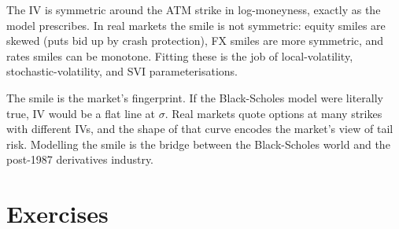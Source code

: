 The IV is symmetric around the ATM strike in log-moneyness, exactly as
the model prescribes. In real markets the smile is not symmetric: equity
smiles are skewed (puts bid up by crash protection), FX smiles are more
symmetric, and rates smiles can be monotone. Fitting these is the job of
local-volatility, stochastic-volatility, and SVI parameterisations.

\begin{keyinsight}
The smile is the market's fingerprint. If the Black-Scholes model were
literally true, IV would be a flat line at $\sigma$. Real markets quote
options at many strikes with different IVs, and the shape of that curve
encodes the market's view of tail risk. Modelling the smile is the bridge
between the Black-Scholes world and the post-1987 derivatives industry.
\end{keyinsight}

\section{Exercises}

